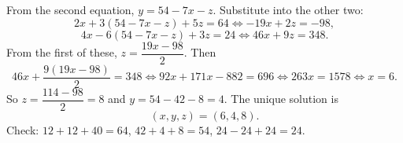 From the second equation, $y=54-7x-z$. Substitute into the other two:
\[
2x+3(54-7x-z)+5z=64\iff-19x+2z=-98,
\]
\[
4x-6(54-7x-z)+3z=24\iff46x+9z=348 .
\]
From the first of these, $z=\dfrac{19x-98}{2}$. Then
\[
46x+\dfrac{9(19x-98)}{2}=348\iff92x+171x-882=696\iff263x=1578\iff x=6 .
\]
So $z=\dfrac{114-98}{2}=8$ and $y=54-42-8=4$. The unique solution is
\[
\boxed{(x,y,z)=(6,4,8)}.
\]
Check: $12+12+40=64$, $42+4+8=54$, $24-24+24=24$.
